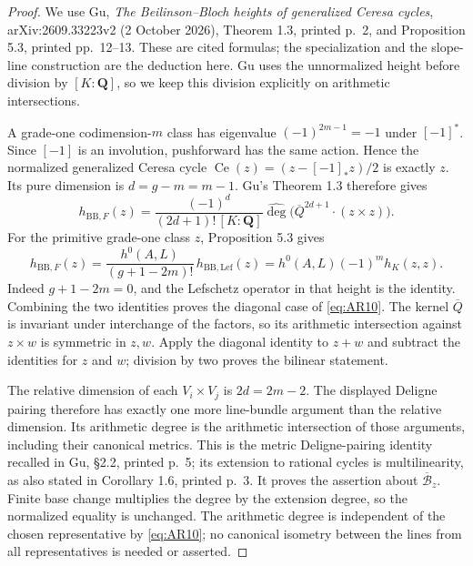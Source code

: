 \begin{proof}
We use Gu, \emph{The Beilinson--Bloch heights of generalized Ceresa
cycles}, arXiv:2609.33223v2 (2 October 2026), Theorem 1.3, printed p.~2,
and Proposition 5.3, printed pp.~12--13. These are cited formulas;
the specialization and the slope-line construction are the deduction
here. Gu uses the unnormalized height before division by $[K:\mathbf Q]$,
so we keep this division explicitly on arithmetic intersections.

A grade-one codimension-$m$ class has eigenvalue $(-1)^{2m-1}=-1$
under $[-1]^*$. Since $[-1]$ is an involution, pushforward has the same
action. Hence the normalized generalized Ceresa cycle
$\operatorname{Ce}(z)=(z-[-1]_*z)/2$ is exactly $z$.
Its pure dimension is $d=g-m=m-1$. Gu's Theorem 1.3 therefore gives
\[
 h_{\mathrm{BB},F}(z)=
 \frac{(-1)^d}{(2d+1)!\,[K:\mathbf Q]}
 \widehat{\deg}\bigl(\overline Q^{2d+1}\cdot(z\times z)\bigr).
\]
For the primitive grade-one class $z$, Proposition 5.3 gives
\[
 h_{\mathrm{BB},F}(z)=
 \frac{h^0(A,L)}{(g+1-2m)!}\,h_{\mathrm{BB},\mathrm{Lef}}(z)
 =h^0(A,L)(-1)^m h_K(z,z).
\]
Indeed $g+1-2m=0$, and the Lefschetz operator in that height is the
identity. Combining the two identities proves the diagonal case of
\eqref{eq:AR10}. The kernel $\overline Q$ is invariant under interchange
of the factors, so its arithmetic intersection against $z\times w$
is symmetric in $z,w$. Apply the diagonal identity to $z+w$ and
subtract the identities for $z$ and $w$; division by two proves the
bilinear statement.

The relative dimension of each $V_i\times V_j$ is $2d=2m-2$.
The displayed Deligne pairing therefore has exactly one more line-bundle
argument than the relative dimension. Its arithmetic degree is the
arithmetic intersection of those arguments, including their canonical
metrics. This is the metric Deligne-pairing identity recalled in Gu,
\S2.2, printed p.~5; its extension to rational cycles is multilinearity,
as also stated in Corollary 1.6, printed p.~3. It proves the assertion
about $\overline{\mathcal B}_z$. Finite base change multiplies the degree
by the extension degree, so the normalized equality is unchanged.
The arithmetic degree is independent of the chosen representative by
\eqref{eq:AR10}; no canonical isometry between the lines from all
representatives is needed or asserted.


\end{proof}
